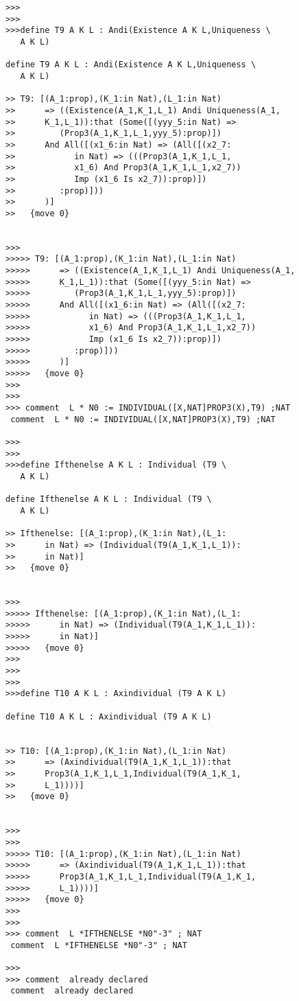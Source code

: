 \documentclass{article}
\begin{document}
\begin{verbatim}
>>>
>>>
>>>define T9 A K L : Andi(Existence A K L,Uniqueness \
   A K L)

define T9 A K L : Andi(Existence A K L,Uniqueness \
   A K L)

>> T9: [(A_1:prop),(K_1:in Nat),(L_1:in Nat)
>>      => ((Existence(A_1,K_1,L_1) Andi Uniqueness(A_1,
>>      K_1,L_1)):that (Some([(yyy_5:in Nat) =>
>>         (Prop3(A_1,K_1,L_1,yyy_5):prop)])
>>      And All([(x1_6:in Nat) => (All([(x2_7:
>>            in Nat) => (((Prop3(A_1,K_1,L_1,
>>            x1_6) And Prop3(A_1,K_1,L_1,x2_7))
>>            Imp (x1_6 Is x2_7)):prop)])
>>         :prop)]))
>>      )]
>>   {move 0}


>>>
>>>>> T9: [(A_1:prop),(K_1:in Nat),(L_1:in Nat)
>>>>>      => ((Existence(A_1,K_1,L_1) Andi Uniqueness(A_1,
>>>>>      K_1,L_1)):that (Some([(yyy_5:in Nat) =>
>>>>>         (Prop3(A_1,K_1,L_1,yyy_5):prop)])
>>>>>      And All([(x1_6:in Nat) => (All([(x2_7:
>>>>>            in Nat) => (((Prop3(A_1,K_1,L_1,
>>>>>            x1_6) And Prop3(A_1,K_1,L_1,x2_7))
>>>>>            Imp (x1_6 Is x2_7)):prop)])
>>>>>         :prop)]))
>>>>>      )]
>>>>>   {move 0}
>>>
>>>
>>> comment  L * N0 := INDIVIDUAL([X,NAT]PROP3(X),T9) ;NAT
 comment  L * N0 := INDIVIDUAL([X,NAT]PROP3(X),T9) ;NAT

>>>
>>>
>>>define Ifthenelse A K L : Individual (T9 \
   A K L)

define Ifthenelse A K L : Individual (T9 \
   A K L)

>> Ifthenelse: [(A_1:prop),(K_1:in Nat),(L_1:
>>      in Nat) => (Individual(T9(A_1,K_1,L_1)):
>>      in Nat)]
>>   {move 0}


>>>
>>>>> Ifthenelse: [(A_1:prop),(K_1:in Nat),(L_1:
>>>>>      in Nat) => (Individual(T9(A_1,K_1,L_1)):
>>>>>      in Nat)]
>>>>>   {move 0}
>>>
>>>
>>>
>>>define T10 A K L : Axindividual (T9 A K L)

define T10 A K L : Axindividual (T9 A K L)


>> T10: [(A_1:prop),(K_1:in Nat),(L_1:in Nat)
>>      => (Axindividual(T9(A_1,K_1,L_1)):that
>>      Prop3(A_1,K_1,L_1,Individual(T9(A_1,K_1,
>>      L_1))))]
>>   {move 0}


>>>
>>>
>>>>> T10: [(A_1:prop),(K_1:in Nat),(L_1:in Nat)
>>>>>      => (Axindividual(T9(A_1,K_1,L_1)):that
>>>>>      Prop3(A_1,K_1,L_1,Individual(T9(A_1,K_1,
>>>>>      L_1))))]
>>>>>   {move 0}
>>>
>>>
>>> comment  L *IFTHENELSE *N0"-3" ; NAT
 comment  L *IFTHENELSE *N0"-3" ; NAT

>>>
>>> comment  already declared
 comment  already declared


\end{verbatim}
\end{document}
